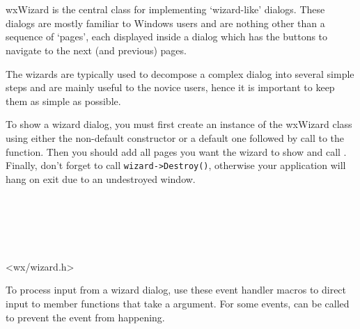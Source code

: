 
\section{}\label{wxwizard}

wxWizard is the central class for implementing `wizard-like' dialogs. These
dialogs are mostly familiar to Windows users and are nothing other than a
sequence of `pages', each displayed inside a dialog which has the
buttons to navigate to the next (and previous) pages.

The wizards are typically used to decompose a complex dialog into several
simple steps and are mainly useful to the novice users, hence it is important
to keep them as simple as possible.

To show a wizard dialog, you must first create an instance of the wxWizard class
using either the non-default constructor or a default one followed by call to the 
 function. Then you should add all pages you
want the wizard to show and call .
Finally, don't forget to call {\tt wizard->Destroy()}, otherwise your application will hang on exit due to an undestroyed window.


\\
\\
\\
\\


<wx/wizard.h>


To process input from a wizard dialog, use these event handler macros to
direct input to member functions that take a 
 argument. For some events, 
 can be called to prevent the event from
happening.

